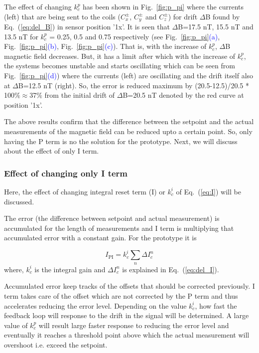 The effect of changing $k_c^p$ has been shown in Fig.~\ref{fig:p_pi} where the currents (left) that are being sent to the coils ($C_x^\pm$, $C_y^\pm$ and $C_z^\pm$) for drift $\Delta$B found by Eq.~(\ref{eq:del_B}) in sensor position '1x'.  It is seen that $\Delta$B=17.5 nT, 15.5 nT and 13.5 nT for $k_c^p$ = 0.25, 0.5 and 0.75 respectively (see Fig.~\ref{fig:p_pi}\textcolor{blue}{(a)}, Fig.~\ref{fig:p_pi}\textcolor{blue}{(b)}, Fig.~\ref{fig:p_pi}\textcolor{blue}{(c)}). That is, with the increase of $k_c^p$, $\Delta$B magnetic field decreases. But, it has a limit after which with the increase of $k_c^p$, the systems becomes unstable and starts oscillating which can be seen from Fig.~\ref{fig:p_pi}\textcolor{blue}{(d)}) where the currents (left) are oscillating and the drift itself also at $\Delta$B=12.5 nT (right). So, the error is reduced maximum by (20.5-12.5)/20.5 * 100$\%\approx$37$\%$ from the initial drift of $\Delta$B=20.5 nT denoted by the red curve at position '1x'. 

\FloatBarrier
The above results confirm that the difference between the setpoint and the actual measurements of the magnetic field can be reduced upto a certain point. So, only having the P term is no the solution for the prototype. Next, we will discuss about the effect of only I term.

\subsubsection{Effect of changing only I term}
Here, the effect of changing integral reset term (I) or $k_c^i$ of Eq.~(\ref{eq:I}) will be discussed.

The error (the difference between setpoint and actual measurement) is accumulated for the length of measurements and I term is multiplying that accumulated error  with a constant gain. For the prototype it is

\begin{equation}
    I_{\text{PI}}=k_c^i \sum_n \Delta I_c^n
\end{equation}
where, $k_c^i$ is the integral gain and $\Delta I_c^n$ is explained in Eq.~(\ref{eq:del_I}).

Accumulated error keep tracks of the offsets that should be corrected previously. I term takes care of the offset which are not corrected by the P term and thus accelerates reducing the error level. Depending on the value $k_c^i$, how fast the feedback loop will response to the drift in the signal will be determined. A large value of $k_c^p$ will result large faster response to reducing the error level and eventually it reaches a threshold point above which the actual measurement will overshoot i.e. exceed the setpoint. 



